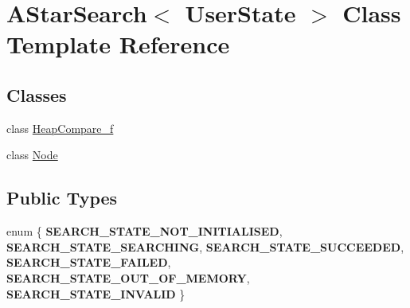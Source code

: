 \hypertarget{class_a_star_search}{}\section{A\+Star\+Search$<$ User\+State $>$ Class Template Reference}
\label{class_a_star_search}
\subsection*{Classes}
\begin{DoxyCompactItemize}
\item 
class \hyperlink{class_a_star_search_1_1_heap_compare__f}{Heap\+Compare\+\_\+f}
\item 
class \hyperlink{class_a_star_search_1_1_node}{Node}
\end{DoxyCompactItemize}
\subsection*{Public Types}
\begin{DoxyCompactItemize}
\item 
\mbox{\label{class_a_star_search_ab18b4b77ea5a384872d24f70eb0bb37e}} 
enum \{ \newline
{\bfseries S\+E\+A\+R\+C\+H\+\_\+\+S\+T\+A\+T\+E\+\_\+\+N\+O\+T\+\_\+\+I\+N\+I\+T\+I\+A\+L\+I\+S\+ED}, 
{\bfseries S\+E\+A\+R\+C\+H\+\_\+\+S\+T\+A\+T\+E\+\_\+\+S\+E\+A\+R\+C\+H\+I\+NG}, 
{\bfseries S\+E\+A\+R\+C\+H\+\_\+\+S\+T\+A\+T\+E\+\_\+\+S\+U\+C\+C\+E\+E\+D\+ED}, 
{\bfseries S\+E\+A\+R\+C\+H\+\_\+\+S\+T\+A\+T\+E\+\_\+\+F\+A\+I\+L\+ED}, 
\newline
{\bfseries S\+E\+A\+R\+C\+H\+\_\+\+S\+T\+A\+T\+E\+\_\+\+O\+U\+T\+\_\+\+O\+F\+\_\+\+M\+E\+M\+O\+RY}, 
{\bfseries S\+E\+A\+R\+C\+H\+\_\+\+S\+T\+A\+T\+E\+\_\+\+I\+N\+V\+A\+L\+ID}
 \}
\end{DoxyCompactItemize}
